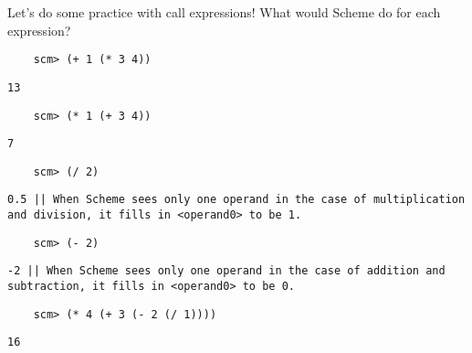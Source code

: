 \begin{blocksection}
Let's do some practice with call expressions! What would Scheme do for each expression?

\begin{lstlisting}
    scm> (+ 1 (* 3 4))
\end{lstlisting}
\begin{solution}[.25in]
    \texttt{13}
\end{solution}

\begin{lstlisting}
    scm> (* 1 (+ 3 4))
\end{lstlisting}
\begin{solution}[.25in]
    \texttt{7}
\end{solution}

\begin{lstlisting}
    scm> (/ 2)
\end{lstlisting}
\begin{solution}[.25in]
    \texttt{0.5 || When Scheme sees only one operand in the case of multiplication and division, it fills in <operand0> to be 1.}
\end{solution}

\begin{lstlisting}
    scm> (- 2)
\end{lstlisting}
\begin{solution}[.25in]
    \texttt{-2 || When Scheme sees only one operand in the case of addition and subtraction, it fills in <operand0> to be 0.}
\end{solution}

\begin{lstlisting}
    scm> (* 4 (+ 3 (- 2 (/ 1))))
\end{lstlisting}
\begin{solution}[.25in]
    \texttt{16}
\end{solution}
\end{blocksection}